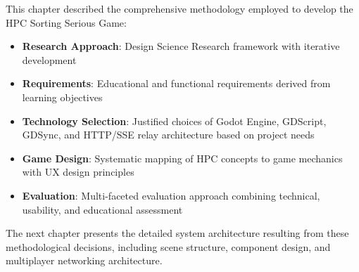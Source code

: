 This chapter described the comprehensive methodology employed to develop the HPC Sorting Serious Game:

\begin{itemize}
    \item \textbf{Research Approach}: Design Science Research framework with iterative development
    \item \textbf{Requirements}: Educational and functional requirements derived from learning objectives
    \item \textbf{Technology Selection}: Justified choices of Godot Engine, GDScript, GDSync, and HTTP/SSE relay architecture based on project needs
    \item \textbf{Game Design}: Systematic mapping of HPC concepts to game mechanics with UX design principles
    \item \textbf{Evaluation}: Multi-faceted evaluation approach combining technical, usability, and educational assessment
\end{itemize}

The next chapter presents the detailed system architecture resulting from these methodological decisions, including scene structure, component design, and multiplayer networking architecture.
